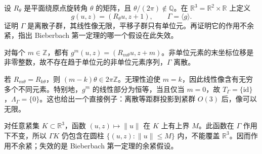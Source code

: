 \begin{exercise}
	\label{g1:ex:irrational-screw-periodicity}
	设 \(R_\theta\) 是平面绕原点旋转角 \(\theta\) 的矩阵，且 \(\theta/(2\pi)\notin\mathbb Q\)。在 \(\mathbb R^3=\mathbb R^2\times\mathbb R\) 上定义
	\[
		g(u,z)=(R_\theta u,z+1),\qquad \Gamma=\langle g\rangle.
	\]
	证明 \(\Gamma\) 是离散子群，其线性像无限，平移子群只有单位元。再证明它的作用不余紧，指出 Bieberbach 第一定理的哪一个假设在此失效。
\end{exercise}
\begin{solution}
	对每个 \(m\in\mathbb Z\)，都有 \(g^m(u,z)=(R_{m\theta}u,z+m)\)。非单位元素的末坐标位移是非零整数，故不存在趋于单位元的非单位元素序列，\(\Gamma\) 离散。

	若 \(R_{m\theta}=R_{k\theta}\)，则 \((m-k)\theta\in2\pi\mathbb Z\)。无理性迫使 \(m=k\)，因此线性像含有无穷多个不同元素。特别地，\(g^m\) 的线性部分为恒等，当且仅当 \(m=0\)，故 \(T_\Gamma=\{\mathrm{id}\}\)，\(\Lambda_\Gamma=\{0\}\)。这也给出一个直接例子：离散等距群投影到紧群 \(O(3)\) 后，像可以无限。

	对任意紧集 \(K\subset\mathbb R^3\)，函数 \((u,z)\mapsto\lVert u\rVert\) 在 \(K\) 上有上界 \(M\)。此函数在 \(\Gamma\) 作用下不变，所以 \(\Gamma K\) 仍包含在圆柱 \(\{(u,z):\lVert u\rVert\le M\}\) 内，不能覆盖 \(\mathbb R^3\)。因而作用不余紧；失效的是 Bieberbach 第一定理的余紧假设。
\end{solution}

